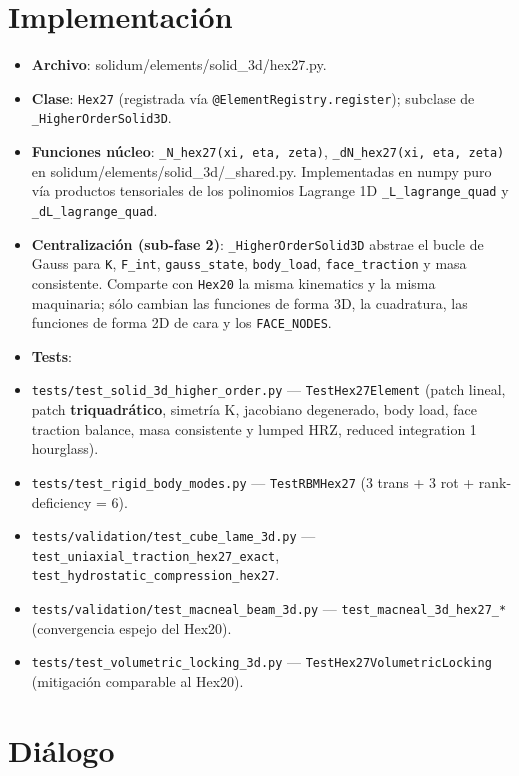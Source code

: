 \documentclass[11pt,letterpaper,oneside]{report}
\begin{document}
\section{Implementación}

\begin{itemize}
  \item \textbf{Archivo}: solidum/elements/solid\_3d/hex27.py.
  \item \textbf{Clase}: \texttt{Hex27} (registrada vía \texttt{@ElementRegistry.register}); subclase de \texttt{\_HigherOrderSolid3D}.
  \item \textbf{Funciones núcleo}: \texttt{\_N\_hex27(xi, eta, zeta)}, \texttt{\_dN\_hex27(xi, eta, zeta)} en solidum/elements/solid\_3d/\_shared.py. Implementadas en numpy puro vía productos tensoriales de los polinomios Lagrange 1D \texttt{\_L\_lagrange\_quad} y \texttt{\_dL\_lagrange\_quad}.
  \item \textbf{Centralización (sub-fase 2)}: \texttt{\_HigherOrderSolid3D} abstrae el bucle de Gauss para \texttt{K}, \texttt{F\_int}, \texttt{gauss\_state}, \texttt{body\_load}, \texttt{face\_traction} y masa consistente. Comparte con \texttt{Hex20} la misma kinematics y la misma maquinaria; sólo cambian las funciones de forma 3D, la cuadratura, las funciones de forma 2D de cara y los \texttt{FACE\_NODES}.
  \item \textbf{Tests}:
  \item \texttt{tests/test\_solid\_3d\_higher\_order.py} --- \texttt{TestHex27Element} (patch lineal, patch \textbf{triquadrático}, simetría K, jacobiano degenerado, body load, face traction balance, masa consistente y lumped HRZ, reduced integration 1 hourglass).
  \item \texttt{tests/test\_rigid\_body\_modes.py} --- \texttt{TestRBMHex27} (3 trans + 3 rot + rank-deficiency = 6).
  \item \texttt{tests/validation/test\_cube\_lame\_3d.py} --- \texttt{test\_uniaxial\_traction\_hex27\_exact}, \texttt{test\_hydrostatic\_compression\_hex27}.
  \item \texttt{tests/validation/test\_macneal\_beam\_3d.py} --- \texttt{test\_macneal\_3d\_hex27\_*} (convergencia espejo del Hex20).
  \item \texttt{tests/test\_volumetric\_locking\_3d.py} --- \texttt{TestHex27VolumetricLocking} (mitigación comparable al Hex20).
\end{itemize}


\section{Diálogo}
\end{document}
